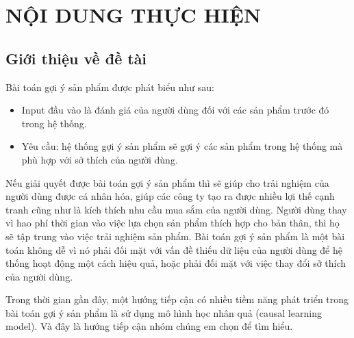 \documentclass{article}[14pt]
\begin{document}
    \section{NỘI DUNG THỰC HIỆN}
    {

    
    \subsection{Giới thiệu về đề tài}
    
    Bài toán gợi ý sản phẩm được phát biểu như sau:
    \begin{itemize}
        \item Input đầu vào là đánh giá của người dùng đối với các sản phẩm trước đó trong hệ thống.
        \item Yêu cầu: hệ thống gợi ý sản phẩm sẽ gợi ý các sản phẩm trong hệ thống mà phù hợp với sở thích của người dùng.
    \end{itemize}
    Nếu giải quyết được bài toán gợi ý sản phẩm thì sẽ giúp cho trải nghiệm của người dùng được cá nhân hóa, giúp các công ty tạo ra được nhiều lợi thế cạnh tranh cũng như là kích thích nhu cầu mua sắm của người dùng. Người dùng thay vì hao phí thời gian vào việc lựa chọn sản phẩm thích hợp cho bản thân, thì họ sẽ tập trung vào việc trải nghiệm sản phẩm. Bài toán gợi ý sản phẩm là một bài toán không dễ vì nó phải đối mặt với vấn đề thiếu dữ liệu của người dùng để hệ thống hoạt động một cách hiệu quả, hoặc phải đối mặt với việc thay đổi sở thích của người dùng.
    
    Trong thời gian gần đây, một hướng tiếp cận có nhiều tiềm năng phát triển trong bài toán gợi ý sản phẩm là sử dụng mô hình học nhân quả (causal learning model). Và đây là hướng tiếp cận nhóm chúng em chọn để tìm hiểu.
}
\end{document}
